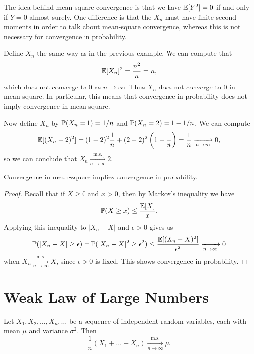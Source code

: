 \begin{remark}
  The idea behind mean-square convergence is that
  we have
  $\mathbb{E}[Y^2] = 0$ if and only if $Y = 0$ almost surely.
  One difference is that the $X_n$ must have
  finite second moments in order to talk about
  mean-square convergence, whereas this is
  not necessary for convergence in probability.
\end{remark}

\begin{example}
  Define $X_n$ the same way as in the previous
  example. We can compute that
  \[
    \mathbb{E}[X_n]^2 = \frac{n^2}{n} = n,
  \]
  which does not converge to $0$ as $n \to \infty$.
  Thus $X_n$ does not converge to $0$ in mean-square.
  In particular, this means that convergence
  in probability does not imply convergence in
  mean-square.
\end{example}

\begin{example}
  Now define $X_n$ by
  $\mathbb{P}(X_n = 1) = 1 / n$ and
  $\mathbb{P}(X_n = 2) = 1 - 1 / n$. We can compute
  \[
    \mathbb{E}[(X_n - 2)^2]
    = (1 - 2)^2 \frac{1}{n} + (2 - 2)^2 \left(1 - \frac{1}{n}\right)
    = \frac{1}{n} \xrightarrow[n \to \infty]{} 0,
  \]
  so we can conclude that
  $X_n \xrightarrow[n \to \infty]{\mathrm{m.s.}} 2$.
\end{example}

\begin{prop}
  Convergence in mean-square implies convergence
  in probability.
\end{prop}

\begin{proof}
  Recall that if $X \ge 0$ and $x > 0$, then by Markov's inequality
  we have
  \[
    \mathbb{P}(X \ge x) \le \frac{\mathbb{E}[X]}{x}.
  \]
  Applying this inequality to $|X_n - X|$ and $\epsilon > 0$
  gives us
  \[
    \mathbb{P}(|X_n - X| \ge \epsilon)
    = \mathbb{P}(|X_n - X|^2 \ge \epsilon^2)
    \le \frac{\mathbb{E}[(X_n - X)^2]}{\epsilon^2}
    \xrightarrow[n \to \infty]{} 0
  \]
  when $X_n \xrightarrow[n \to \infty]{\mathrm{m.s.}} X$,
  since $\epsilon > 0$ is fixed. This shows
  convergence in probability.
\end{proof}

\section{Weak Law of Large Numbers}
\begin{theorem}
  Let $X_1, X_2, \dots, X_n, \dots$ be a sequence
  of independent random variables, each with
  mean $\mu$ and variance $\sigma^2$. Then
  \[
    \frac{1}{n}(X_1 + \dots + X_n) \xrightarrow[n \to \infty]{\mathrm{m.s.}} \mu.
  \]
\end{theorem}

